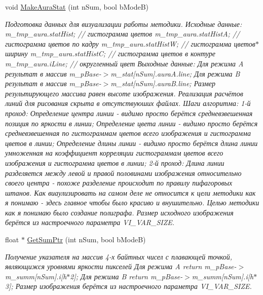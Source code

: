 \begin{DoxyCompactItemize}
void \hyperlink{class_c_v_i_engine_thread_a6194597cfb410aaa4a3b291f9dbe13cd}{Make\+Aura\+Stat} (int n\+Sum, bool b\+Mode\+B)
\begin{DoxyCompactList}\small\item\em Подготовка данных для визуализации работы методики. Исходные данные\+: m\+\_\+tmp\+\_\+aura.\+stat\+Hist; // гистограмма цветов m\+\_\+tmp\+\_\+aura.\+stat\+Hist\+A; // гистограмма цветов по кадру m\+\_\+tmp\+\_\+aura.\+stat\+Hist\+W; // гистограмма цветов$\ast$ширину m\+\_\+tmp\+\_\+aura.\+stat\+Hist\+C; // гистограмма цветов в контуре m\+\_\+tmp\+\_\+aura.\+i\+Line; // округленный цвет Выходные данные\+: Для режима A результат в массив m\+\_\+p\+Base-\/$>$m\+\_\+stat\mbox{[}n\+Sum\mbox{]}.aura\+A.\+line; Для режима B результат в массив m\+\_\+p\+Base-\/$>$m\+\_\+stat\mbox{[}n\+Sum\mbox{]}.aura\+B.\+line; Размер результирующего массива равен высоте изображения. Реализация расчётов линий для рисования скрыта в отсутствуюших файлах. Шаги алгоритма\+: 1-\/й проход\+: Определение центра линии -\/ видимо просто берётся средневзвешенная позиция по яркости в линии; Определение цвета линии -\/ видимо просто берётся средневзвешенная по гистограммам цветов всего изображения и гистограмма цветов в линии; Определение длины линии -\/ видимо просто берётся длина линии умноженная на коэффициент корреляции гистограммам цветов всего изображения и гистограмма цветов в линии; 2-\/й проход\+: Длина линии разделяется между левой и правой половинами изображения относительно своего центра -\/ похоже разделение происходит по правилу пифагоровых штанов. Как виаулизировать на самом деле не относится к цели методики как я понимаю -\/ здесь главное чтобы было красиво и внушительно. Целью методики как я понимаю было создание полиграфа. Размер исходного изображения берётся из настроечного параметра V\+I\+\_\+\+V\+A\+R\+\_\+\+S\+I\+Z\+E. \end{DoxyCompactList}\item 
float $\ast$ \hyperlink{class_c_v_i_engine_thread_a157eaab33c9c5c2a157b458a4a0eb1f4}{Get\+Sum\+Ptr} (int n\+Sum, bool b\+Mode\+B)
\begin{DoxyCompactList}\small\item\em Получение указателя на массив 4-\/х байтных чисел с плавающей точкой, являющижся уровнями яркости пикселей Для режима A return m\+\_\+p\+Base-\/$>$m\+\_\+summ\mbox{[}n\+Sum\mbox{]}.i\mbox{[}h$\ast$2\mbox{]}; Для режима B return m\+\_\+p\+Base-\/$>$m\+\_\+summ\mbox{[}n\+Sum\mbox{]}.i\mbox{[}h$\ast$3\mbox{]}; Размер изображения берётся из настроечного параметра V\+I\+\_\+\+V\+A\+R\+\_\+\+S\+I\+Z\+E. \end{DoxyCompactList}\item 

\end{DoxyCompactItemize}
